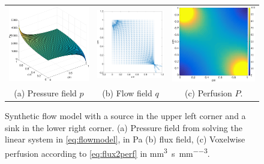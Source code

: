 \documentclass[paper=a4, fontsize=11pt,parskip=half,headings=small]{scrartcl}
\newcommand{\siP}{\cubic\milli\meter\per\second\per\cubic\milli\meter}
\begin{document}
	\begin{figure}[H]
		\centering
		\begin{tabular}{c c c}
			\includegraphics[width=.3\textwidth]{figs/pressure.eps} & \includegraphics[width=.3\textwidth]{figs/flowQuiver.eps} & \includegraphics[width=.3\textwidth]{figs/perfusion.eps}\\
			(a) Pressure field $p$ & (b) Flow field $q$ & (c) Perfusion $P$.
		\end{tabular}
    	\caption{Synthetic flow model with a source in the upper left corner and a sink in the lower right corner. (a) Pressure field from solving the linear system in \eqref{eq:flowmodel}, in \si{\pascal} (b) flux field, (c) Voxelwise perfusion according to \eqref{eq:flux2perf} in \si{\siP}.}
	        \label{fig:flowpressureperfusion}
	\end{figure}
	
\end{document}
